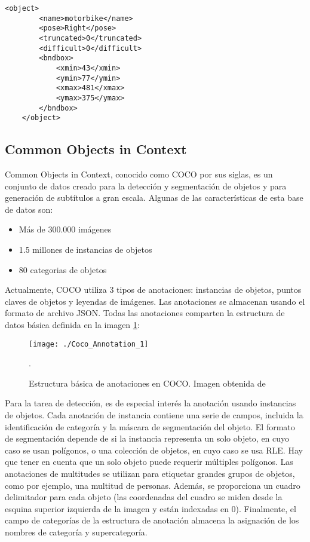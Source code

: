 \documentclass[a4paper, 12pt, spanish, chapterprefix, numbers=noenddot]{book}
\begin{document}
\begin{lstlisting}[frame=single]
	<object>
		<name>motorbike</name>
		<pose>Right</pose>
		<truncated>0</truncated>
		<difficult>0</difficult>
		<bndbox>
			<xmin>43</xmin>
			<ymin>77</ymin>
			<xmax>481</xmax>
			<ymax>375</ymax>
		</bndbox>
	</object>
\end{lstlisting}

\subsection{Common Objects in Context}\label{COCO}

Common Objects in Context\cite{CocoHome}, conocido como COCO por sus siglas, es un conjunto de datos creado para la detección y segmentación de objetos y para generación de subtítulos a gran escala. Algunas de las características de esta base de datos son:

\begin{itemize}
\item Más de 300.000 imágenes
\item 1.5 millones de instancias de objetos
\item 80 categorias de objetos
\end{itemize}

Actualmente, COCO utiliza 3 tipos de anotaciones: instancias de objetos, puntos claves de objetos y leyendas de imágenes. Las anotaciones se almacenan usando el formato de archivo JSON. Todas las anotaciones comparten la estructura de datos básica definida en la imagen \ref{CocoAnnotations}:

\begin{figure}[H]
\begin{center}
\texttt{[image: ./Coco\_Annotation\_1]}
\caption{Estructura básica de anotaciones en COCO. Imagen obtenida de \cite{CocoAnnotations}}.
\label{CocoAnnotations}
\end{center}
\end{figure}

Para la tarea de detección, es de especial interés la anotación usando instancias de objetos. Cada anotación de instancia contiene una serie de campos, incluida la identificación de categoría y la máscara de segmentación del objeto. El formato de segmentación depende de si la instancia representa un solo objeto, en cuyo caso se usan polígonos, o una colección de objetos, en cuyo caso se usa RLE. Hay que tener en cuenta que un solo objeto puede requerir múltiples polígonos. Las anotaciones de multitudes se utilizan para etiquetar grandes grupos de objetos, como por ejemplo, una multitud de personas. Además, se proporciona un cuadro delimitador para cada objeto (las coordenadas del cuadro se miden desde la esquina superior izquierda de la imagen y están indexadas en 0). Finalmente, el campo de categorías de la estructura de anotación almacena la asignación de los nombres de categoría y supercategoría.
\end{document}
